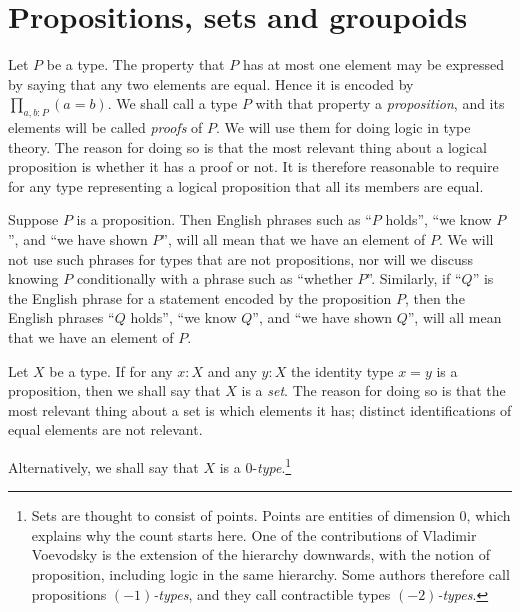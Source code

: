 
\section{Propositions, sets and groupoids}
\label{sec:props-sets-grpds}

Let $P$ be a type.  The property that $P$ has at most one element may 
be expressed by saying that any two elements are equal. 
Hence it is encoded by $\prod_{a,b:P} (a=b)$.  
We shall call a type $P$ with that property a \emph{proposition},%
and its elements will be called \emph{proofs} of $P$.%
We will use them for doing logic in type theory.
The reason for doing so is that the most relevant
thing about a logical proposition is whether it has a proof or not.
It is therefore reasonable to require for any type representing 
a logical proposition that all its members are equal.

Suppose $P$ is a proposition.  Then English phrases such as ``$P$ holds'', ``we know $P$'', and ``we have shown $P$'', will all mean that we
have an element of $P$.  We will not use such phrases for types that are not propositions, nor will we discuss knowing $P$ conditionally with a
phrase such as ``whether $P$''.  Similarly, if ``$Q$'' is the English phrase for a statement encoded by the proposition $P$, then the English
phrases ``$Q$ holds'', ``we know $Q$'', and ``we have shown $Q$'', will all mean that we have an element of $P$.

Let $X$ be a type.  If for any $x:X$ and any $y:X$ the identity 
type $x=y$ is a proposition, then we shall say that $X$ is a \emph{set}.%
The reason for doing so is that the most relevant
thing about a set is which elements it has; distinct identifications
of equal elements are not relevant.

Alternatively, we shall say that $X$ is a $0$-\emph{type}.\footnote{%
Sets are thought to consist of points. Points are entities of dimension 0, 
which explains why the count starts here.
One of the contributions of Vladimir Voevodsky is the extension of
the hierarchy downwards, with the notion of proposition,
including logic in the same hierarchy.
Some authors therefore call propositions \emph{$(-1)$-types}, 
and they call contractible types \emph{$(-2)$-types}.}

